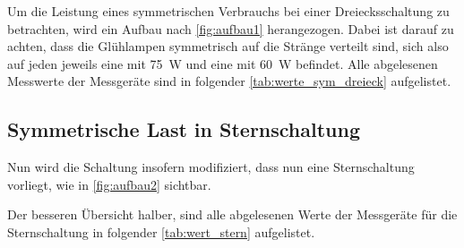 \documentclass[12pt,english,ngerman]{scrartcl}
\begin{document}
Um die Leistung eines symmetrischen Verbrauchs bei einer Dreiecksschaltung zu
betrachten, wird ein Aufbau nach \autoref{fig:aufbau1} herangezogen. Dabei ist
darauf zu achten, dass die Glühlampen symmetrisch auf die Stränge verteilt
sind, sich also auf jeden jeweils eine mit \SI[]{75}{\watt} und eine mit
\SI[]{60}{\watt} befindet. Alle abgelesenen Messwerte der Messgeräte sind in
folgender \autoref{tab:werte_sym_dreieck} aufgelistet.

\begin{table}[H]
	\caption[Abgelesene Werte bei symmetrischer Belastung in Dreiecksschaltung] {Abgelesene
		Werte bei symmetrischer Belastung in Dreiecksschaltung                     \\
		$I_i \dots$ gemessener Strom am i-ten Strang in A                          \\
		$I_{31} \dots$ gemessener Strom zwischen Sternpunkt und Neutralleiter in A \\
		$U_{ij} \dots$ gemessene Spannung zwischen den Strängen i und j in V       \\
		$P_{i}^M \dots$ gemessene Wirkleistungen in W (für genaue Bezeichnung siehe \autoref{fig:aufbau1})
	}\label{tab:werte_sym_dreieck}
	\centering
	
	
\end{table}

\subsection{Symmetrische Last in Sternschaltung}

Nun wird die Schaltung insofern modifiziert, dass nun eine Sternschaltung
vorliegt, wie in \autoref{fig:aufbau2} sichtbar.

Der besseren Übersicht halber, sind alle abgelesenen Werte der Messgeräte für
die Sternschaltung in folgender \autoref{tab:wert_stern} aufgelistet.

\end{document}
